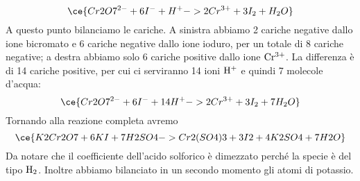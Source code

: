 \begin{soluzione}
\begin{equation*}
        \ce{Cr2O7^{2-} + 6I^- + H^+ -> 2Cr^{3+} + 3I_2 + H_2O}
    \end{equation*}
    A questo punto bilanciamo le cariche. A sinistra abbiamo 2 cariche negative dallo ione bicromato e 6 cariche negative dallo ione ioduro, per un totale di 8 cariche negative; a destra abbiamo solo 6 cariche positive dallo ione $\rm Cr^{3+}$. La differenza è di 14 cariche positive, per cui ci serviranno 14 ioni $\rm H^+$ e quindi 7 molecole d'acqua:
    \begin{equation*}
        \ce{Cr2O7^{2-} + 6I^- + 14H^+ -> 2Cr^{3+} + 3I_2 + 7H_2O}
    \end{equation*}
    Tornando alla reazione completa avremo
    \begin{equation*}
        \ce{K2Cr2O7 + 6KI + 7H2SO4 -> Cr2(SO4)3 + 3I2 + 4K2SO4 + 7H2O}
    \end{equation*}
    Da notare che il coefficiente dell'acido solforico è dimezzato perché la specie è del tipo $\rm H_2$. Inoltre abbiamo bilanciato in un secondo momento gli atomi di potassio.
\end{soluzione}

\newpage

